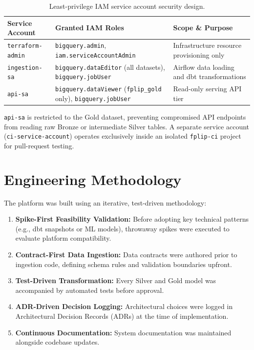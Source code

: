 \documentclass[12pt, a4paper]{report}
\begin{document}
\begin{table}[h]
\centering
\begin{tabularx}{\textwidth}{@{}p{2.6cm} p{6.0cm} X@{}}
\toprule
\textbf{\color{primary}Service Account} & \textbf{\color{primary}Granted IAM Roles} & \textbf{\color{primary}Scope \& Purpose} \\
\midrule
\texttt{terraform-admin} & \texttt{bigquery.admin}, \texttt{iam.serviceAccountAdmin} & Infrastructure resource provisioning only \\
\texttt{ingestion-sa} & \texttt{bigquery.dataEditor} (all datasets), \texttt{bigquery.jobUser} & Airflow data loading and dbt transformations \\
\texttt{api-sa} & \texttt{bigquery.dataViewer} (\texttt{fplip\_gold} only), \texttt{bigquery.jobUser} & Read-only serving API tier \\
\bottomrule
\end{tabularx}
\caption{Least-privilege IAM service account security design.}
\label{tab:iam}
\end{table}

\texttt{api-sa} is restricted to the Gold dataset, preventing compromised API endpoints from reading raw Bronze or intermediate Silver tables. A separate service account (\texttt{ci-service-account}) operates exclusively inside an isolated \texttt{fplip-ci} project for pull-request testing.

\section{Engineering Methodology}
The platform was built using an iterative, test-driven methodology:
\begin{enumerate}
    \item \textbf{Spike-First Feasibility Validation:} Before adopting key technical patterns (e.g., dbt snapshots or ML models), throwaway spikes were executed to evaluate platform compatibility.
    \item \textbf{Contract-First Data Ingestion:} Data contracts were authored prior to ingestion code, defining schema rules and validation boundaries upfront.
    \item \textbf{Test-Driven Transformation:} Every Silver and Gold model was accompanied by automated tests before approval.
    \item \textbf{ADR-Driven Decision Logging:} Architectural choices were logged in Architectural Decision Records (ADRs) at the time of implementation.
    \item \textbf{Continuous Documentation:} System documentation was maintained alongside codebase updates.
\end{enumerate}
\end{document}
